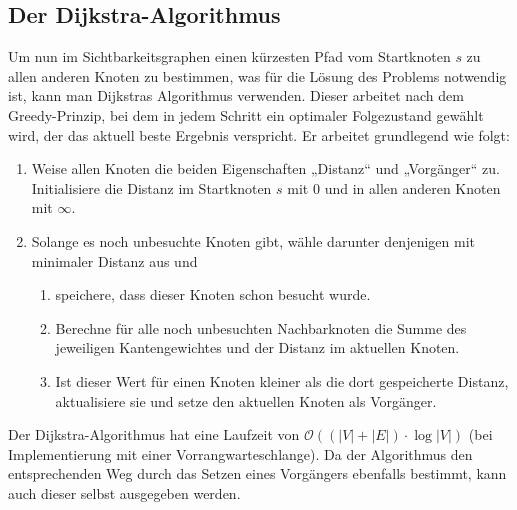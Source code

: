 \documentclass[a4paper, notitlepage, 12pt]{scrartcl}
\begin{document}
 \subsection{Der Dijkstra-Algorithmus}
 Um nun im Sichtbarkeitsgraphen einen kürzesten Pfad vom Startknoten $s$ zu allen anderen Knoten zu bestimmen, was für die Lösung des Problems notwendig ist, kann man Dijkstras Algorithmus verwenden. Dieser arbeitet nach dem Greedy-Prinzip, bei dem in jedem Schritt ein optimaler Folgezustand gewählt wird, der das aktuell beste Ergebnis verspricht. Er arbeitet grundlegend wie folgt:
 \begin{enumerate}
 	\item Weise allen Knoten die beiden Eigenschaften „Distanz“ und „Vorgänger“ zu. Initialisiere die Distanz im Startknoten $s$ mit 0 und in allen anderen Knoten mit $\infty$.
 	\item Solange es noch unbesuchte Knoten gibt, wähle darunter denjenigen mit minimaler Distanz aus und
 	\begin{enumerate}
 		\item speichere, dass dieser Knoten schon besucht wurde.
 		\item Berechne für alle noch unbesuchten Nachbarknoten die Summe des jeweiligen Kantengewichtes und der Distanz im aktuellen Knoten.
 		\item Ist dieser Wert für einen Knoten kleiner als die dort gespeicherte Distanz, aktualisiere sie und setze den aktuellen Knoten als Vorgänger.
 	\end{enumerate}
 \end{enumerate}
Der Dijkstra-Algorithmus hat eine Laufzeit von $\mathcal{O}((|V|+|E|) \cdot \log |V|)$ (bei Implementierung mit einer Vorrangwarteschlange). Da der Algorithmus den entsprechenden Weg durch das Setzen eines Vorgängers ebenfalls bestimmt, kann auch dieser selbst ausgegeben werden.
\end{document}
